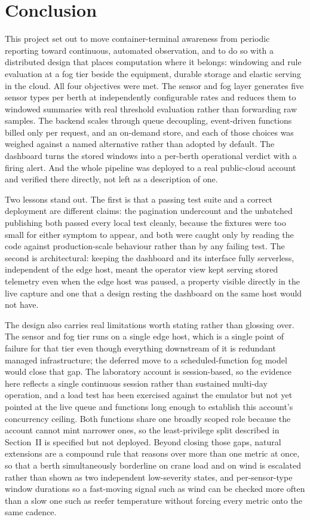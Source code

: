 \documentclass[conference]{IEEEtran}
\begin{document}
\section{Conclusion}

This project set out to move container-terminal awareness from periodic reporting toward continuous, automated observation, and to do so with a distributed design that places computation where it belongs: windowing and rule evaluation at a fog tier beside the equipment, durable storage and elastic serving in the cloud. All four objectives were met. The sensor and fog layer generates five sensor types per berth at independently configurable rates and reduces them to windowed summaries with real threshold evaluation rather than forwarding raw samples. The backend scales through queue decoupling, event-driven functions billed only per request, and an on-demand store, and each of those choices was weighed against a named alternative rather than adopted by default. The dashboard turns the stored windows into a per-berth operational verdict with a firing alert. And the whole pipeline was deployed to a real public-cloud account and verified there directly, not left as a description of one.

Two lessons stand out. The first is that a passing test suite and a correct deployment are different claims: the pagination undercount and the unbatched publishing both passed every local test cleanly, because the fixtures were too small for either symptom to appear, and both were caught only by reading the code against production-scale behaviour rather than by any failing test. The second is architectural: keeping the dashboard and its interface fully serverless, independent of the edge host, meant the operator view kept serving stored telemetry even when the edge host was paused, a property visible directly in the live capture and one that a design resting the dashboard on the same host would not have.

The design also carries real limitations worth stating rather than glossing over. The sensor and fog tier runs on a single edge host, which is a single point of failure for that tier even though everything downstream of it is redundant managed infrastructure; the deferred move to a scheduled-function fog model would close that gap. The laboratory account is session-based, so the evidence here reflects a single continuous session rather than sustained multi-day operation, and a load test has been exercised against the emulator but not yet pointed at the live queue and functions long enough to establish this account's concurrency ceiling. Both functions share one broadly scoped role because the account cannot mint narrower ones, so the least-privilege split described in Section~II is specified but not deployed. Beyond closing those gaps, natural extensions are a compound rule that reasons over more than one metric at once, so that a berth simultaneously borderline on crane load and on wind is escalated rather than shown as two independent low-severity states, and per-sensor-type window durations so a fast-moving signal such as wind can be checked more often than a slow one such as reefer temperature without forcing every metric onto the same cadence.



\end{document}
